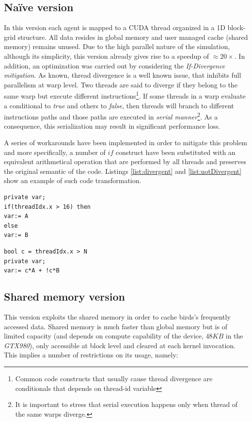 \subsection{Na\"{i}ve version}
In this version each agent is mapped to a CUDA thread organized in a 1D block-grid structure.
All data resides in global memory and user managed cache (shared memory) remains unused. 
Due to the high parallel nature of the simulation, although its simplicity, this version already gives rise to a speedup of $\approx20 \times$. In addition, an optimization was carried out by considering the \emph{If-Divergence mitigation}. As known, thread divergence is a well known
issue, that inhibits full parallelism at warp level. Two threads are said to
diverge if they belong to the same warp but execute different
instructions\footnote{Common code constructs that usually cause thread
	divergence are conditionals that depends on  thread-id variable}. If some
threads in a warp evaluate a conditional to \emph{true} and others to \emph{false}, then threads will branch to different instructions paths
and those paths are executed in \emph{serial manner}\footnote{It is important to
	stress that serial execution happens only when thread of the same warps 
	diverge.}\cite{NvidiaprogGuide}. As a consequence, this serialization may result in significant performance loss.

A series of workarounds have been implemented in order to mitigate this problem and more specifically, a number of $if$ construct have been substituted with an equivalent arithmetical operation that are performed by all threads and preserves the original semantic of the code. Listings \ref{list:divergent} and \ref{list:notDivergent} show an example of such code transformation.

\begin{lstlisting}[label={list:divergent}, caption={Example of thread divergent code.} ]
private var;
if(threadIdx.x > 16) then
var:= A
else
var:= B
\end{lstlisting}

\begin{lstlisting}[label={list:notDivergent}, caption=If mitigated version of the listing \ref{list:divergent} ]
bool c = threadIdx.x > N
private var;
var:= c*A + !c*B
\end{lstlisting}


\subsection{Shared memory version}
This version exploits the shared memory in order to cache birds's frequently accessed data. Shared memory is much faster than global memory but is of limited capacity (and depends on compute capability of the device, $48 KB$ in the \emph{GTX980})\cite{CUDA2}, only accessible at block level and cleared at each kernel invocation. This implies a number of restrictions on its usage, namely:

